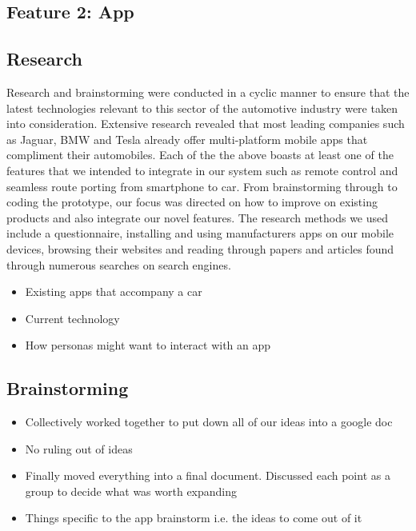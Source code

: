 \documentclass{article}
\begin{document}
\begin{itemize}
\section{Feature 2: App}
\subsection{Research}
Research and brainstorming were conducted in a cyclic manner to ensure that the latest technologies relevant to this sector of the automotive industry were taken into consideration. Extensive research revealed that most leading companies such as Jaguar, BMW and Tesla already offer multi-platform mobile apps that compliment their automobiles. Each of the the above boasts at least one of the features that we intended to integrate in our system such as remote control and seamless route porting from smartphone to car. From brainstorming through to coding the prototype, our focus was directed on how to improve on existing products and also integrate our novel features. 
The research methods we used include a questionnaire, installing and using manufacturers apps on our mobile devices, browsing their websites and reading through papers and articles found through numerous searches on search engines. 
	\begin{itemize}
		\item Existing apps that accompany a car
        \item Current technology
		\item How personas might want to interact with an app
	\end{itemize}
\subsection{Brainstorming}
	\begin{itemize}
		\item Collectively worked together to put down all of our ideas into a google doc
		\item No ruling out of ideas
		\item Finally moved everything into a final document. Discussed each point as a group to decide what was worth expanding
        \item Things specific to the app brainstorm i.e. the ideas to come out of it
	\end{itemize}

\end{itemize}
\end{document}
